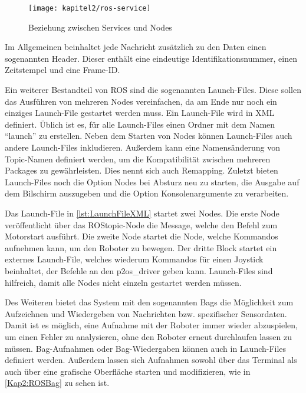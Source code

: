 \begin{figure}[t]
  \centering
  \texttt{[image: kapitel2/ros-service]}
  \caption{Beziehung zwischen Services und Nodes}
  \label{Kap2:ROSService}
\end{figure}

Im Allgemeinen beinhaltet jede Nachricht zusätzlich zu den Daten einen sogenannten Header. Dieser enthält eine eindeutige Identifikationsnummer, einen Zeitstempel und eine Frame-ID.

Ein weiterer Bestandteil von \ac{ROS} sind die sogenannten Launch-Files. Diese sollen das Ausführen von mehreren Nodes vereinfachen, da am Ende nur noch ein einziges Launch-File gestartet werden muss. Ein Launch-File wird in XML definiert. Üblich ist es, für alle Launch-Files einen Ordner mit dem Namen "`launch"' zu erstellen. Neben dem Starten von Nodes können Launch-Files auch andere Launch-Files inkludieren. Außerdem kann eine Namensänderung von Topic-Namen definiert werden, um die Kompatibilität zwischen mehreren Packages zu gewährleisten. Dies nennt sich auch Remapping. Zuletzt bieten Launch-Files noch die Option Nodes bei Absturz neu zu starten, die Ausgabe auf dem Bilschirm auszugeben und die Option Konsolenargumente zu verarbeiten.



Das Launch-File in \autoref{lst:LaunchFileXML} startet zwei Nodes. Die erste Node veröffentlicht über das \ac{ROS}topic-Node die Message, welche den Befehl zum Motorstart ausführt. Die zweite Node startet die Node, welche Kommandos aufnehmen kann, um den Roboter zu bewegen. Der dritte Block startet ein externes Launch-File, welches wiederum Kommandos für einen Joystick beinhaltet, der Befehle an den p2os\_driver geben kann. Launch-Files sind hilfreich, damit alle Nodes nicht einzeln gestartet werden müssen.

Des Weiteren bietet das System mit den sogenannten Bags die Möglichkeit zum Aufzeichnen und Wiedergeben von Nachrichten bzw. spezifischer Sensordaten. Damit ist es möglich, eine Aufnahme mit der Roboter immer wieder abzuspielen, um einen Fehler zu analysieren, ohne den Roboter erneut durchlaufen lassen zu müssen. Bag-Aufnahmen oder Bag-Wiedergaben können auch in Launch-Files definiert werden. Außerdem lassen sich Aufnahmen sowohl über das Terminal als auch über eine grafische Oberfläche starten und modifizieren, wie in \autoref{Kap2:ROSBag} zu sehen ist.

